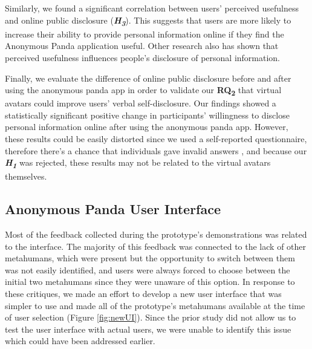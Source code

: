 Similarly, we found a significant correlation between users' perceived usefulness and online public disclosure (\textbf{\textit{H\textsubscript{3}}}). This suggests that users are more likely to increase their ability to provide personal information online if they find the Anonymous Panda application useful. Other research \cite{ZHO18, SHA21} also has shown that perceived usefulness influences people's disclosure of personal information.

Finally, we evaluate the difference of online public disclosure before and after using the anonymous panda app in order to validate our \textbf{RQ\textsubscript{2}} that virtual avatars could improve users' verbal self-disclosure. Our findings showed a statistically significant positive change in participants' willingness to disclose personal information online after using the anonymous panda app. However, these results could be easily distorted since we used a self-reported questionnaire, therefore there's a chance that individuals gave invalid answers \cite{DEM15}, and because our \textbf{\textit{H\textsubscript{1}}} was rejected, these results may not be related to the virtual avatars themselves.

\subsection{Anonymous Panda User Interface}
Most of the feedback collected during the prototype's demonstrations was related to the interface. The majority of this feedback was connected to the lack of other metahumans, which were present but the opportunity to switch between them was not easily identified, and users were always forced to choose between the initial two metahumans since they were unaware of this option. In response to these critiques, we made an effort to develop a new user interface that was simpler to use and made all of the prototype's metahumans available at the time of user selection (Figure \ref{fig:newUI}). Since the prior study did not allow us to test the user interface with actual users, we were unable to identify this issue which could have been addressed earlier.

